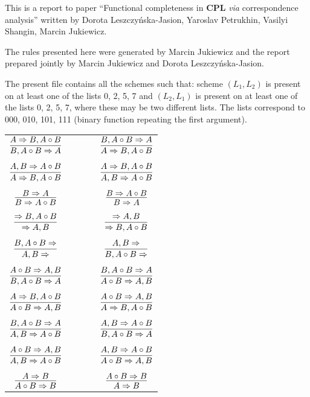 \documentclass[11pt]{article}
\begin{document}
	
This is a report to paper ``Functional completeness in \textbf{CPL} \textit{via} correspondence analysis'' written by Dorota Leszczy\'{n}ska-Jasion, Yaroslav Petrukhin, Vasilyi Shangin, Marcin Jukiewicz. 
	
The rules presented here were generated by Marcin Jukiewicz and the report prepared jointly by Marcin Jukiewicz and Dorota Leszczy\'{n}ska-Jasion.

The present file contains all the schemes such that: scheme $(L_1, L_2)$ is present on at least one of the lists 0, 2, 5, 7 and $(L_2, L_1)$ is present on at least one of the lists 0, 2, 5, 7, where these may be two different lists. The lists correspond to 000, 010, 101, 111 (binary function repeating the first argument).
	
\bigskip
	
\begin{center}

\begin{tabular}{ccc}
$\infer{B, A\circ B\Rightarrow A}{A\Rightarrow B, A\circ B}$ & \ \ \ \ & $\infer{A\Rightarrow B, A\circ B}{B, A\circ B\Rightarrow A}$ \\
&& \\
$\infer{A\Rightarrow B, A\circ B}{A, B\Rightarrow A\circ B}$ && $\infer{A, B\Rightarrow A\circ B}{A\Rightarrow B, A\circ B}$ \\
&& \\
$\infer{B\Rightarrow A\circ B}{B\Rightarrow A}$ && $\infer{B\Rightarrow A}{B\Rightarrow A\circ B}$ \\
&& \\
$\infer{\Rightarrow A, B}{\Rightarrow B, A\circ B}$ && $\infer{\Rightarrow B, A\circ B}{\Rightarrow A, B}$ \\
&& \\
$\infer{A, B\Rightarrow }{B, A\circ B\Rightarrow }$ && $\infer{B, A\circ B\Rightarrow }{A, B\Rightarrow }$ \\
&& \\
$\infer{B, A\circ B\Rightarrow A}{A\circ B\Rightarrow A, B}$ && $\infer{A\circ B\Rightarrow A, B}{B, A\circ B\Rightarrow A}$ \\
&& \\
$\infer{A\circ B\Rightarrow A, B}{A\Rightarrow B, A\circ B}$ && $\infer{A\Rightarrow B, A\circ B}{A\circ B\Rightarrow A, B}$ \\
&& \\
$\infer{A, B\Rightarrow A\circ B}{B, A\circ B\Rightarrow A}$ && $\infer{B, A\circ B\Rightarrow A}{A, B\Rightarrow A\circ B}$ \\
&& \\
$\infer{A, B\Rightarrow A\circ B}{A\circ B\Rightarrow A, B}$ && $\infer{A\circ B\Rightarrow A, B}{A, B\Rightarrow A\circ B}$ \\
&& \\
$\infer{A\circ B\Rightarrow B}{A\Rightarrow B}$ && 
$\infer{A\Rightarrow B}{A\circ B\Rightarrow B}$
\end{tabular}

\end{center}
\end{document}
